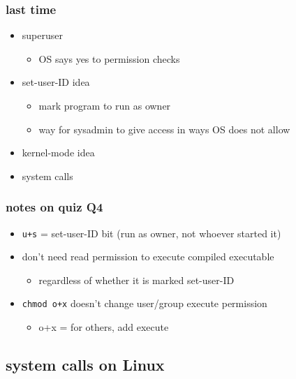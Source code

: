 \date{}
\title{}
\date{}

\begin{frame}
    \titlepage
\end{frame}



\begin{frame}
\frametitle{last time}
\begin{itemize}
\item superuser
    \begin{itemize}
    \item OS says yes to permission checks
    \end{itemize}
\item set-user-ID idea
    \begin{itemize}
    \item mark program to run as owner
    \item way for sysadmin to give access in ways OS does not allow
    \end{itemize}
\item kernel-mode idea
\item system calls
\end{itemize}
\end{frame}

\begin{frame}
\frametitle{notes on quiz Q4}
\begin{itemize}
\item \texttt{u+s} = set-user-ID bit (run as owner, not whoever started it)
\item don't need read permission to execute compiled executable
    \begin{itemize}
    \item regardless of whether it is marked set-user-ID
    \end{itemize}
\item \texttt{chmod o+x} doesn't change user/group execute permission
    \begin{itemize}
    \item o+x = for others, add execute
    \end{itemize}
\end{itemize}
\end{frame}





\subsection{system calls on Linux}


